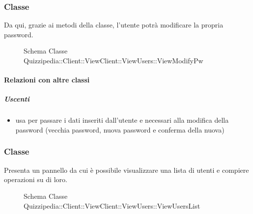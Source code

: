 \subsubsection{Classe }
Da qui, grazie ai metodi della classe, l'utente potrà modificare la propria password.
\begin{figure}[H]
\centering
\noindent{}
\caption[Schema Classe ViewModifyPw]{Schema Classe Quizzipedia::Client::ViewClient::ViewUsers::ViewModifyPw}
\end{figure}
\paragraph{Relazioni con altre classi}
\subparagraph{Uscenti}
\begin{itemize}
\item usa  per passare i dati inseriti dall'utente e necessari alla modifica della password (vecchia password, nuova password e conferma della nuova)
\end{itemize}
\subsubsection{Classe }
Presenta un pannello da cui è possibile visualizzare una lista di utenti e compiere operazioni su di loro.
\begin{figure}[H]
\centering
\noindent{}
\caption[Schema Classe ViewUsersList]{Schema Classe Quizzipedia::Client::ViewClient::ViewUsers::ViewUsersList}
\end{figure}

